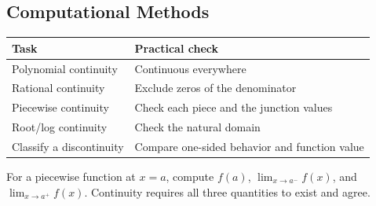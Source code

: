\subsection*{Computational Methods}

\begin{center}
\begin{tabular}{ll}
\toprule
Task & Practical check \\
\midrule
Polynomial continuity & Continuous everywhere \\
Rational continuity & Exclude zeros of the denominator \\
Piecewise continuity & Check each piece and the junction values \\
Root/log continuity & Check the natural domain \\
Classify a discontinuity & Compare one-sided behavior and function value \\
\bottomrule
\end{tabular}
\end{center}

\begin{example*}
For a piecewise function at \(x=a\), compute \(f(a)\),
\(\lim_{x\to a^-} f(x)\), and \(\lim_{x\to a^+} f(x)\). Continuity requires
all three quantities to exist and agree.
\end{example*}
